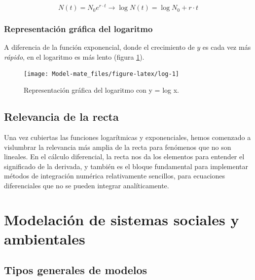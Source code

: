 \documentclass[
]{book}
\begin{document}
\begin{equation}
    N(t) = N_0 e^{r \cdot t} \rightarrow \log N(t) = \log N_0 + r \cdot t
\end{equation}

\hypertarget{representaciuxf3n-gruxe1fica-del-logaritmo}{%
\subsubsection{Representación gráfica del logaritmo}\label{representaciuxf3n-gruxe1fica-del-logaritmo}}

A diferencia de la función exponencial, donde el crecimiento de \(y\) es cada vez más \emph{rápido}, en el logaritmo es más lento (figura \ref{fig:log}).

\begin{figure}

{\centering \texttt{[image: Model-mate\_files/figure-latex/log-1]} 

}

\caption{Representación gráfica del logaritmo con y = log x.}\label{fig:log}
\end{figure}

\hypertarget{relevancia-de-la-recta}{%
\subsection{Relevancia de la recta}\label{relevancia-de-la-recta}}

Una vez cubiertas las funciones logarítmicas y exponenciales, hemos comenzado a vislumbrar la relevancia más amplia de la recta para fenómenos que no son lineales. En el cálculo diferencial, la recta nos da los elementos para entender el significado de la derivada, y también es el bloque fundamental para implementar métodos de integración numérica relativamente sencillos, para ecuaciones diferenciales que no se pueden integrar analíticamente.

\hypertarget{modelaciuxf3n-de-sistemas-sociales-y-ambientales}{%
\section{Modelación de sistemas sociales y ambientales}\label{modelaciuxf3n-de-sistemas-sociales-y-ambientales}}

\hypertarget{tipos-generales-de-modelos}{%
\subsection{Tipos generales de modelos}\label{tipos-generales-de-modelos}}
\end{document}
